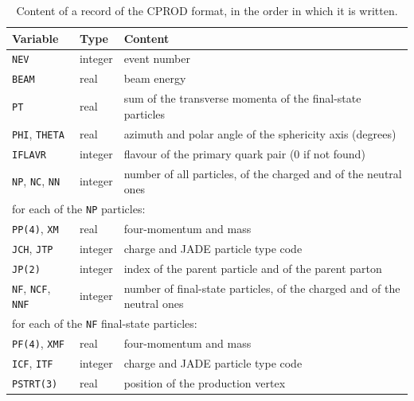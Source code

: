 \begin{table}[H]\centering
\begin{tabular}{|l|l|p{}|}\hline
Variable & Type & Content \\\hline\hline
\texttt{NEV} & integer & event number \\
\texttt{BEAM} & real & beam energy \\
\texttt{PT} & real & sum of the transverse momenta of the final-state particles \\
\texttt{PHI}, \texttt{THETA} & real & azimuth and polar angle of the sphericity axis (degrees) \\
\texttt{IFLAVR} & integer & flavour of the primary quark pair (0 if not found) \\
\texttt{NP}, \texttt{NC}, \texttt{NN} & integer & number of all particles, of the charged and of the neutral ones \\\hline
\multicolumn{3}{|l|}{for each of the \texttt{NP} particles:} \\\hline
\texttt{PP(4)}, \texttt{XM} & real & four-momentum and mass \\
\texttt{JCH}, \texttt{JTP} & integer & charge and JADE particle type code \\
\texttt{JP(2)} & integer & index of the parent particle and of the parent parton \\\hline
\texttt{NF}, \texttt{NCF}, \texttt{NNF} & integer & number of final-state particles, of the charged and of the neutral ones \\\hline
\multicolumn{3}{|l|}{for each of the \texttt{NF} final-state particles:} \\\hline
\texttt{PF(4)}, \texttt{XMF} & real & four-momentum and mass \\
\texttt{ICF}, \texttt{ITF} & integer & charge and JADE particle type code \\
\texttt{PSTRT(3)} & real & position of the production vertex \\\hline
\end{tabular}
\caption{Content of a record of the CPROD format, in the order in which it is written.}
\label{tab:cprod}
\end{table}

